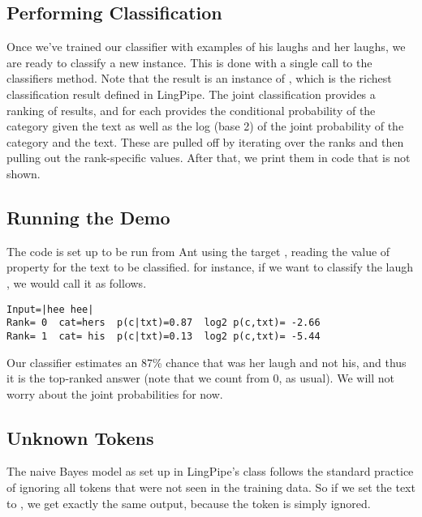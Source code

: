 \subsection{Performing Classification}

Once we've trained our classifier with examples of his laughs and
her laughs, we are ready to classify a new instance.  This is
done with a single call to the classifiers 
method.
%
%
Note that the result is an instance of ,
which is the richest classification result defined in LingPipe.  The
joint classification provides a ranking of results, and for each
provides the conditional probability of the category given the text as
well as the log (base 2) of the joint probability of the category and
the text.  These are pulled off by iterating over the ranks and
then pulling out the rank-specific values.  After that, we print them
in code that is not shown.

\subsection{Running the Demo}

The code is set up to be run from Ant using the target ,
reading the value of property  for the text to be classified.
for instance, if we want to classify the laugh ,
we would call it as follows.
%
\begin{verbatim}
Input=|hee hee|
Rank= 0  cat=hers  p(c|txt)=0.87  log2 p(c,txt)= -2.66
Rank= 1  cat= his  p(c|txt)=0.13  log2 p(c,txt)= -5.44
\end{verbatim}
%
Our classifier estimates an 87\% chance that  was
her laugh and not his, and thus it is the top-ranked answer (note that
we count from 0, as usual).  We will not worry about the joint
probabilities for now.  

\subsection{Unknown Tokens}

The naive Bayes model as set up in LingPipe's
 class follows the standard practice
of ignoring all tokens that were not seen in the training data.  So
if we set the text to , we get exactly
the same output, because the token  is simply
ignored.

